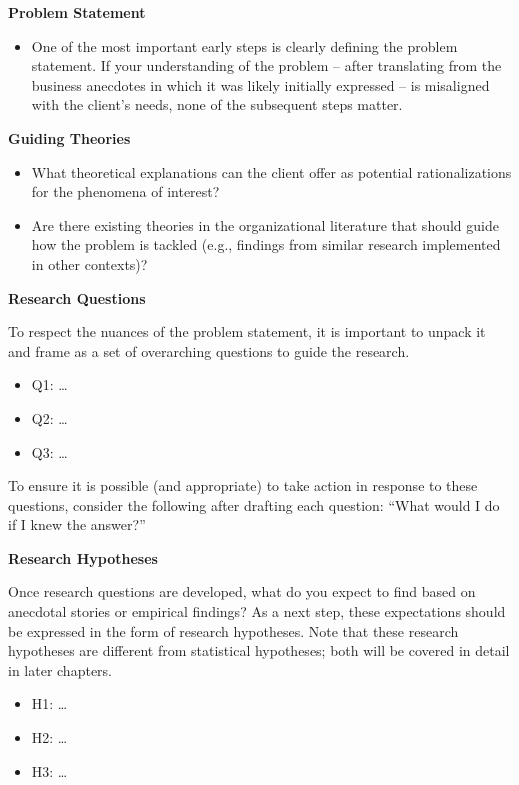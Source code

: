 \documentclass[
]{book}
\providecommand{\tightlist}{%
  \setlength{\itemsep}{0pt}\setlength{\parskip}{0pt}}
\begin{document}
\textbf{Problem Statement}

\begin{itemize}
\tightlist
\item
  One of the most important early steps is clearly defining the problem statement. If your understanding of the problem -- after translating from the business anecdotes in which it was likely initially expressed -- is misaligned with the client's needs, none of the subsequent steps matter.
\end{itemize}

\textbf{Guiding Theories}

\begin{itemize}
\tightlist
\item
  What theoretical explanations can the client offer as potential rationalizations for the phenomena of interest?
\item
  Are there existing theories in the organizational literature that should guide how the problem is tackled (e.g., findings from similar research implemented in other contexts)?
\end{itemize}

\textbf{Research Questions}

To respect the nuances of the problem statement, it is important to unpack it and frame as a set of overarching questions to guide the research.

\begin{itemize}
\tightlist
\item
  Q1: \ldots{}
\item
  Q2: \ldots{}
\item
  Q3: \ldots{}
\end{itemize}

To ensure it is possible (and appropriate) to take action in response to these questions, consider the following after drafting each question: ``What would I do if I knew the answer?''

\textbf{Research Hypotheses}

Once research questions are developed, what do you expect to find based on anecdotal stories or empirical findings? As a next step, these expectations should be expressed in the form of research hypotheses. Note that these research hypotheses are different from statistical hypotheses; both will be covered in detail in later chapters.

\begin{itemize}
\tightlist
\item
  H1: \ldots{}
\item
  H2: \ldots{}
\item
  H3: \ldots{}
\end{itemize}
\end{document}
